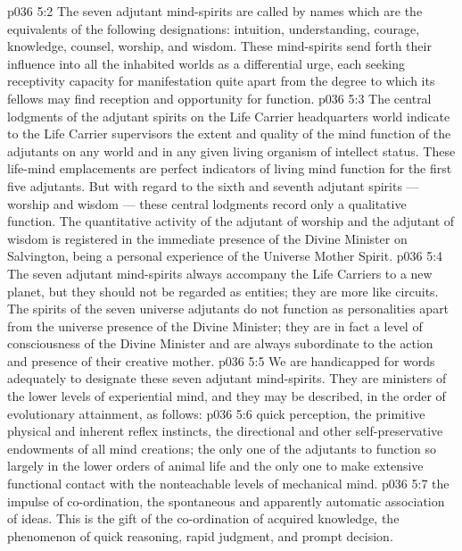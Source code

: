 \vs p036 5:2 The seven adjutant mind\hyp{}spirits are called by names which are the equivalents of the following designations: intuition, understanding, courage, knowledge, counsel, worship, and wisdom. These mind\hyp{}spirits send forth their influence into all the inhabited worlds as a differential urge, each seeking receptivity capacity for manifestation quite apart from the degree to which its fellows may find reception and opportunity for function.
\vs p036 5:3 The central lodgments of the adjutant spirits on the Life Carrier headquarters world indicate to the Life Carrier supervisors the extent and quality of the mind function of the adjutants on any world and in any given living organism of intellect status. These life\hyp{}mind emplacements are perfect indicators of living mind function for the first five adjutants. But with regard to the sixth and seventh adjutant spirits --- worship and wisdom --- these central lodgments record only a qualitative function. The quantitative activity of the adjutant of worship and the adjutant of wisdom is registered in the immediate presence of the Divine Minister on Salvington, being a personal experience of the Universe Mother Spirit.
\vs p036 5:4 \pc The seven adjutant mind\hyp{}spirits always accompany the Life Carriers to a new planet, but they should not be regarded as entities; they are more like circuits. The spirits of the seven universe adjutants do not function as personalities apart from the universe presence of the Divine Minister; they are in fact a level of consciousness of the Divine Minister and are always subordinate to the action and presence of their creative mother.
\vs p036 5:5 We are handicapped for words adequately to designate these seven adjutant mind\hyp{}spirits. They are ministers of the lower levels of experiential mind, and they may be described, in the order of evolutionary attainment, as follows:
\vs p036 5:6 \pc {}\bibnobreakspace {} quick perception, the primitive physical and inherent reflex instincts, the directional and other self\hyp{}preservative endowments of all mind creations; the only one of the adjutants to function so largely in the lower orders of animal life and the only one to make extensive functional contact with the nonteachable levels of mechanical mind.
\vs p036 5:7 \pc {}\bibnobreakspace {} the impulse of co\hyp{}ordination, the spontaneous and apparently automatic association of ideas. This is the gift of the co\hyp{}ordination of acquired knowledge, the phenomenon of quick reasoning, rapid judgment, and prompt decision.
